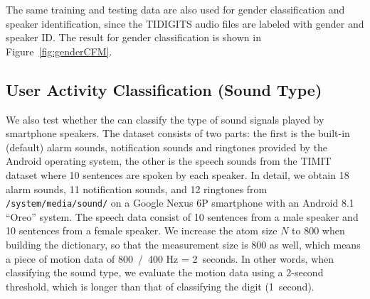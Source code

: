 The same training and testing data are also used for gender classification and speaker identification, since the TIDIGITS audio files are labeled with gender and speaker ID. The result for gender classification is shown in Figure~\ref{fig:genderCFM}.




\subsection{User Activity Classification (Sound Type)}


We also test whether the {\systemName} can classify the type of sound signals played by smartphone speakers. The dataset consists of two parts: the first is the built-in (default) alarm sounds, notification sounds and ringtones provided by the Android operating system, the other is the speech sounds from the TIMIT~\cite{garofolo1993timit} dataset where 10 sentences are spoken by each speaker.
%
In detail, we obtain 18 alarm sounds, 11 notification sounds, and 12 ringtones from \verb|/system/media/sound/| on a Google Nexus 6P smartphone with an Android 8.1 ``Oreo'' system. The speech data consist of 10 sentences from a male speaker and 10 sentences from a female speaker. We increase the atom size $N$ to 800 when building the dictionary, so that the measurement size is 800 as well, which means a piece of motion data of 800~/~400 Hz = 2~seconds. In other words, when classifying the sound type, we evaluate the motion data using a 2-second threshold, which is longer than that of classifying the digit (1~second).


